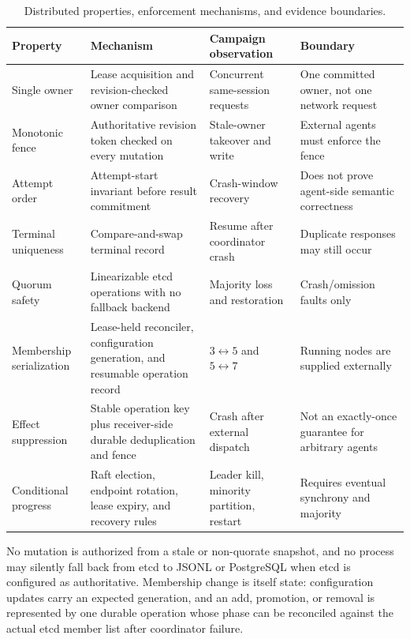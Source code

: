 \begin{table}[htbp]
\centering
\caption{Distributed properties, enforcement mechanisms, and evidence boundaries.}
\label{tab:distributed-properties}
\begingroup
\setlength{\tabcolsep}{3pt}
\begin{tabular}{>{\raggedright\arraybackslash}p{}>{\raggedright\arraybackslash}p{}>{\raggedright\arraybackslash}p{}>{\raggedright\arraybackslash}p{}}
\toprule
\textbf{Property} & \textbf{Mechanism} & \textbf{Campaign observation} & \textbf{Boundary} \\
\midrule
Single owner & Lease acquisition and revision-checked owner comparison & Concurrent same-session requests & One committed owner, not one network request \\
Monotonic fence & Authoritative revision token checked on every mutation & Stale-owner takeover and write & External agents must enforce the fence \\
Attempt order & Attempt-start invariant before result commitment & Crash-window recovery & Does not prove agent-side semantic correctness \\
Terminal uniqueness & Compare-and-swap terminal record & Resume after coordinator crash & Duplicate responses may still occur \\
Quorum safety & Linearizable etcd operations with no fallback backend & Majority loss and restoration & Crash/omission faults only \\
Membership serialization & Lease-held reconciler, configuration generation, and resumable operation record & $3\leftrightarrow5$ and $5\leftrightarrow7$ & Running nodes are supplied externally \\
Effect suppression & Stable operation key plus receiver-side durable deduplication and fence & Crash after external dispatch & Not an exactly-once guarantee for arbitrary agents \\
Conditional progress & Raft election, endpoint rotation, lease expiry, and recovery rules & Leader kill, minority partition, restart & Requires eventual synchrony and majority \\
\bottomrule
\end{tabular}
\endgroup
\end{table}

No mutation is authorized from a stale or non-quorate snapshot, and no process may silently fall back from etcd to JSONL or PostgreSQL when etcd is configured as authoritative. Membership change is itself state: configuration updates carry an expected generation, and an add, promotion, or removal is represented by one durable operation whose phase can be reconciled against the actual etcd member list after coordinator failure.

